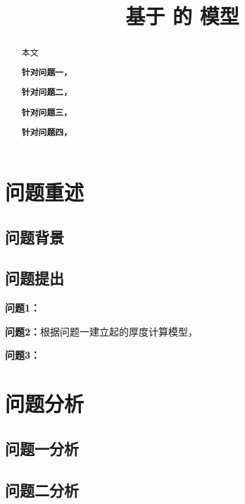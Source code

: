 \documentclass[withoutpreface,bwprint]{cumcmthesis} %
\title{基于 的 模型}
\begin{document}
\maketitle
\nocite{*}


\begin{abstract}
本文

    \textbf{针对问题一，}

    \textbf{针对问题二，}

    \textbf{针对问题三，}

    \textbf{针对问题四，}

\end{abstract}

\section{问题重述}

\subsection{问题背景}


\subsection{问题提出}


\textbf{问题1：}

\textbf{问题2：}根据问题一建立起的厚度计算模型，

\textbf{问题3：}

\section{问题分析}

\subsection{问题一分析}

\subsection{问题二分析}
\end{document}
